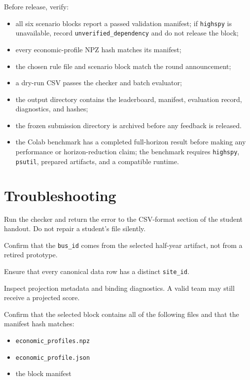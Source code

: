 \documentclass[12pt]{article}
\newcommand{\code}[1]{\texttt{#1}}
\begin{document}
Before release, verify:
\begin{itemize}[leftmargin=*]
  \item all six scenario blocks report a passed validation manifest; if
  \code{highspy} is unavailable, record \code{unverified\_dependency} and do
  not release the block;
  \item every economic-profile NPZ hash matches its manifest;
  \item the chosen rule file and scenario block match the round announcement;
  \item a dry-run CSV passes the checker and batch evaluator;
  \item the output directory contains the leaderboard, manifest, evaluation
  record, diagnostics, and hashes;
  \item the frozen submission directory is archived before any feedback is released.
  \item the Colab benchmark has a completed full-horizon result before making
  any performance or horizon-reduction claim; the benchmark requires
  \code{highspy}, \code{psutil}, prepared artifacts, and a compatible runtime.
\end{itemize}

\section{Troubleshooting}

\begin{description}[leftmargin=2.2cm,style=nextline]
  \item[Malformed CSV] Run the checker and return the error to the CSV-format
  section of the student handout. Do not repair a student's file silently.
  \item[Unknown bus] Confirm that the \code{bus\_id} comes from the selected
  half-year artifact, not from a retired prototype.
  \item[Duplicate site] Ensure that every canonical data row has a distinct
  \code{site\_id}.
  \item[Joint infeasibility] Inspect projection metadata and binding diagnostics.
  A valid team may still receive a projected score.
  \item[Missing economic profile] Confirm that the selected block contains all
  of the following files and that the manifest hash matches:
  \begin{itemize}[leftmargin=*]
    \item \code{economic\_profiles.npz}
    \item \code{economic\_profile.json}
    \item the block manifest
  \end{itemize}
\end{description}
\end{document}
